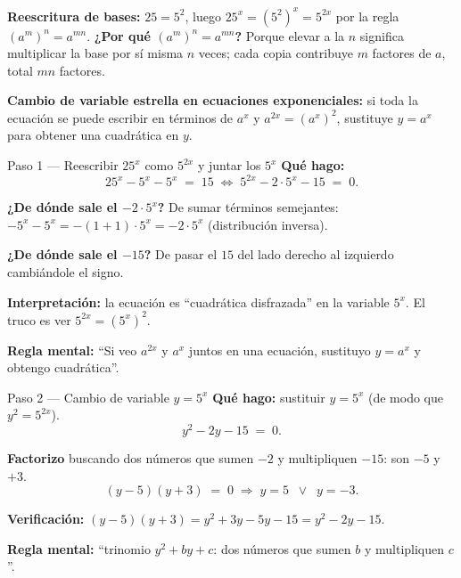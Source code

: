 \documentclass[11pt]{article}
\begin{document}
\begin{teo}
\textbf{Reescritura de bases:} $25=5^2$, luego $25^x=(5^2)^x=5^{2x}$ por la regla $(a^m)^n=a^{mn}$. \textbf{¿Por qué $(a^m)^n=a^{mn}$?} Porque elevar a la $n$ significa multiplicar la base por sí misma $n$ veces; cada copia contribuye $m$ factores de $a$, total $mn$ factores.

\textbf{Cambio de variable estrella en ecuaciones exponenciales:} si toda la ecuación se puede escribir en términos de $a^x$ y $a^{2x}=(a^x)^2$, sustituye $y=a^x$ para obtener una cuadrática en $y$.
\end{teo}

\begin{paso}{Paso 1 --- Reescribir $25^x$ como $5^{2x}$ y juntar los $5^x$}
\textbf{Qué hago:}
\[
25^x-5^x-5^x \;=\; 15 \;\Longleftrightarrow\; 5^{2x}-2\cdot 5^x-15 \;=\; 0.
\]

\textbf{¿De dónde sale el $-2\cdot 5^x$?} De sumar términos semejantes: $-5^x-5^x=-(1+1)\cdot 5^x=-2\cdot 5^x$ (distribución inversa).

\textbf{¿De dónde sale el $-15$?} De pasar el $15$ del lado derecho al izquierdo cambiándole el signo.

\textbf{Interpretación:} la ecuación es ``cuadrática disfrazada'' en la variable $5^x$. El truco es ver $5^{2x}=(5^x)^2$.

\textbf{Regla mental:} ``Si veo $a^{2x}$ y $a^x$ juntos en una ecuación, sustituyo $y=a^x$ y obtengo cuadrática''.
\end{paso}

\begin{paso}{Paso 2 --- Cambio de variable $y=5^x$}
\textbf{Qué hago:} sustituir $y=5^x$ (de modo que $y^2=5^{2x}$).
\[
y^2 - 2y - 15 \;=\; 0.
\]

\textbf{Factorizo} buscando dos números que sumen $-2$ y multipliquen $-15$: son $-5$ y $+3$.
\[
(y-5)(y+3) \;=\; 0 \;\Longrightarrow\; y=5 \;\;\vee\;\; y=-3.
\]

\textbf{Verificación:} $(y-5)(y+3)=y^2+3y-5y-15=y^2-2y-15$. \checkmark

\textbf{Regla mental:} ``trinomio $y^2+by+c$: dos números que sumen $b$ y multipliquen $c$''.
\end{paso}
\end{document}
